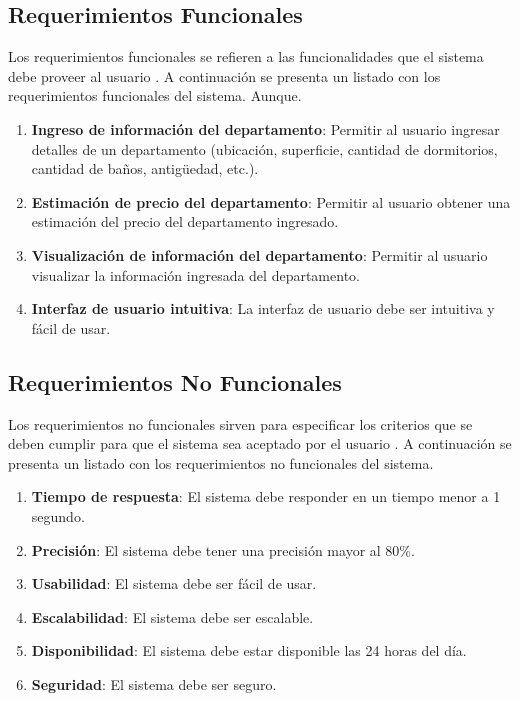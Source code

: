 \subsection{Requerimientos Funcionales}

Los requerimientos funcionales se refieren a las funcionalidades que el
sistema debe proveer al usuario \cite{geeksforgeeks2023functional}. A
continuación se presenta un listado con los requerimientos funcionales del
sistema. Aunque.

\begin{enumerate}
    \item \textbf{Ingreso de información del departamento}: Permitir al usuario
    ingresar detalles de un departamento (ubicación, superficie, cantidad de
    dormitorios, cantidad de baños, antigüedad, etc.).
    \item \textbf{Estimación de precio del departamento}: Permitir al usuario
    obtener una estimación del precio del departamento ingresado.
    \item \textbf{Visualización de información del departamento}: Permitir al
    usuario visualizar la información ingresada del departamento.
    \item \textbf{Interfaz de usuario intuitiva}: La interfaz de usuario debe
    ser intuitiva y fácil de usar.
\end{enumerate}

\subsection{Requerimientos No Funcionales}

Los requerimientos no funcionales sirven para especificar los criterios que
se deben cumplir para que el sistema sea aceptado por el usuario
\cite{geeksforgeeks2023functional}. A continuación se presenta un listado
con los requerimientos no funcionales del sistema.

\begin{enumerate}
    \item \textbf{Tiempo de respuesta}: El sistema debe responder en un tiempo
    menor a 1 segundo.
    \item \textbf{Precisión}: El sistema debe tener una precisión mayor al 80\%.
    \item \textbf{Usabilidad}: El sistema debe ser fácil de usar.
    \item \textbf{Escalabilidad}: El sistema debe ser escalable.
    \item \textbf{Disponibilidad}: El sistema debe estar disponible las 24
    horas del día.
    \item \textbf{Seguridad}: El sistema debe ser seguro.
\end{enumerate}

